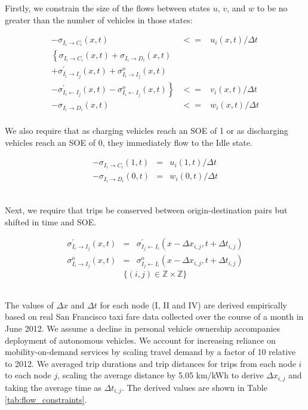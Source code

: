 \documentclass[journal]{IEEEtran}
\begin{document}
Firstly, we constrain the size of the flows between states $u$, $v$, and $w$ to be no greater than the number of vehicles in those states:

\begin{eqnarray*}
    -\sigma_{I_i \rightarrow C_i}(x,t) & <= & u_i(x,t) / \Delta t \\
  \left\{ \sigma_{I_i \rightarrow C_i}(x,t) + \sigma_{I_i \rightarrow D_i}(x,t) \right. && \\
  + \sigma_{I_i \rightarrow I_j}^\prime(x,t) + \sigma_{I_i \rightarrow I_j}^o(x,t) && \\
  \left. - \sigma_{I_i \leftarrow I_j}^\prime(x,t) - \sigma_{I_i \leftarrow I_j}^o(x,t) \right\} & <= & v_i(x,t) / \Delta t \\
    -\sigma_{I_i \rightarrow D_i}(x,t) & <= & w_i(x,t) / \Delta t
\end{eqnarray*}
~\\ 
We also require that as charging vehicles reach an SOE of 1 or as discharging vehicles reach an SOE of 0, they immediately flow to the Idle state.

\begin{eqnarray*}
    -\sigma_{I_i \rightarrow C_i}(1,t) & = & u_i(1,t) / \Delta t \\
    -\sigma_{I_i \rightarrow D_i}(0,t) & = & w_i(0,t) / \Delta t
\end{eqnarray*}

~\\ 
Next, we require that trips be conserved between origin-destination pairs but shifted in time and SOE.

\begin{eqnarray*}
    \sigma_{I_i \rightarrow I_j}^\prime(x,t) & = & \sigma_{I_j \leftarrow I_i}^\prime(x - \Delta x_{i,j},t + \Delta t_{i,j}) \\
     \sigma_{I_i \rightarrow I_j}^o(x,t) & = & \sigma_{I_j \leftarrow I_i}^o(x - \Delta x_{i,j},t + \Delta t_{i,j})
\end{eqnarray*}
\begin{equation*}
\{(i,j) \in \mathbb{Z} \times \mathbb{Z}\} 
\end{equation*}

~\\ 
The values of $\Delta x$ and $\Delta t$ for each node (I, II and IV) are derived empirically based on real San Francisco taxi fare data collected over the course of a month in June 2012. We assume a decline in personal vehicle ownership accompanies deployment of autonomous vehicles. We account for increasing reliance on mobility-on-demand services by scaling travel demand by a factor of 10 relative to 2012. We averaged trip durations and trip distances for trips from each node $i$ to each node $j$, scaling the average distance by 5.05 km/kWh to derive $\Delta x_{i,j}$ and taking the average time as $\Delta t_{i,j}$. The derived values are shown in Table \ref{tab:flow_constraints}.
\end{document}
